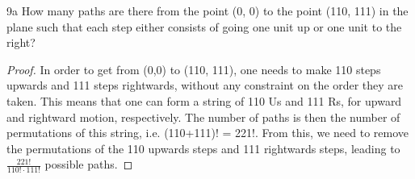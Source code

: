 \begin{exercise}{9a}
    How many paths are there from the point (0, 0) to the point (110, 111) in the
plane such that each step either consists of going one unit up or one unit to the right?

\end{exercise}

\begin{proof}
    In order to get from (0,0) to (110, 111), one needs to make 110 steps upwards and 111 steps rightwards, without any constraint on the order they are taken. This means that one can form a string of 110 Us and 111 Rs, for upward and rightward motion, respectively. The number of paths is then the number of permutations of this string, i.e. (110+111)! = 221!. From this, we need to remove the permutations of the 110 upwards steps and 111 rightwards steps, leading to  $\frac{221!}{110! \cdot 111!}$ possible paths.
\end{proof}

